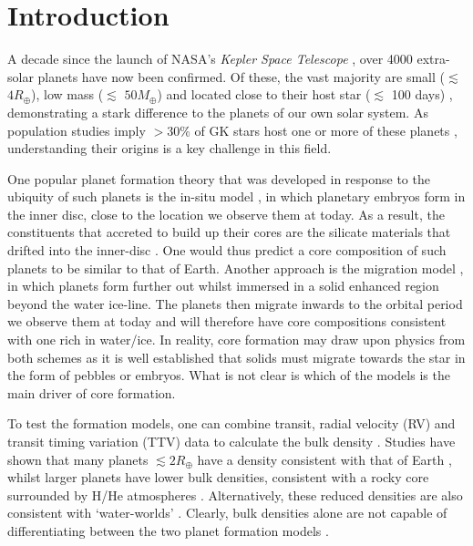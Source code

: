 \documentclass[fleqn,usenatbib]{mnras}
\begin{document}


\section{Introduction} \label{sec:Intro}
A decade since the launch of NASA's \textit{Kepler Space Telescope} \citep{BoruckiKeplerII}, over 4000 extra-solar planets have now been confirmed. Of these, the vast majority are small ($\lesssim$ $4R_\oplus$), low mass ($\lesssim$ $50M_\oplus$) and located close to their host star ($\lesssim$ 100 days) \citep{Howard2010,Batalha2013,Petigura2013,Mullally2015}, demonstrating a stark difference to the planets of our own solar system. As population studies imply $> 30\%$ of GK stars host one or more of these planets \citep{Fressin2013,Silburt2015,Mulders2018,Zhu2018,Zink2019}, understanding their origins is a key challenge in this field. 

One popular planet formation theory that was developed in response to the ubiquity of such planets is the in-situ model \citep[e.g.][]{Hansen2012,Chiang2013}, in which planetary embryos form in the inner disc, close to the location we observe them at today. As a result, the constituents that accreted to build up their cores are the silicate materials that drifted into the inner-disc \citep{Chatterjee2014,Jankovic2018}. One would thus predict a core composition of such planets to be similar to that of Earth. Another approach is the migration model \citep[e.g.][]{Ida2005,Ida2010,Bodenheimer2014,Raymond2014,Bitsch2018b, Raymond2018}, in which planets form further out whilst immersed in a solid enhanced region beyond the water ice-line. The planets then migrate inwards to the orbital period we observe them at today and will therefore have core compositions consistent with one rich in water/ice. In reality, core formation may draw upon physics from both schemes as it is well established that solids must migrate towards the star in the form of pebbles or embryos. What is not clear is which of the models is the main driver of core formation. 

To test the formation models, one can combine transit, radial velocity (RV) and transit timing variation (TTV) data to calculate the bulk density \citep{Weiss2014,HaddenLithwick2014,Dressing2015,JontofHutter2016}. Studies have shown that many planets $\lesssim 2 R_\oplus$ have a density consistent with that of Earth \citep[e.g.][]{Dressing2015,Dorn2019}, whilst larger planets have lower bulk densities, consistent with a rocky core surrounded by H/He atmospheres \citep[e.g.][]{Rogers2015,WolfgangLopez2015}. Alternatively, these reduced densities are also consistent with `water-worlds' \citep[e.g.][]{Valencia2007,Zeng2019}. Clearly, bulk densities alone are not capable of differentiating between the two planet formation models \citep[e.g.][]{RogersSeager2010}.
\end{document}
